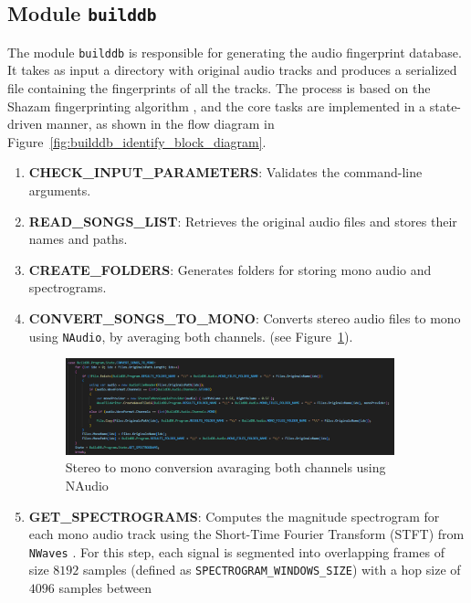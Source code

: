 \documentclass[11pt, a4paper]{article}
\begin{document}
    \newpage

    \subsection{Module \texttt{builddb}}

    The module \texttt{builddb} is responsible for generating the audio fingerprint database. It takes as input a directory with original audio 
    tracks and produces a serialized file containing the fingerprints of all the tracks. The process is based on the Shazam fingerprinting 
    algorithm \cite{ShazamAlgorithmPaper}, and the core tasks are implemented in a state-driven manner, as shown in the flow diagram in 
    Figure~\ref{fig:builddb_identify_block_diagram}.

    \begin{enumerate}
        \item \textbf{CHECK\_INPUT\_PARAMETERS}: Validates the command-line arguments.
        \item \textbf{READ\_SONGS\_LIST}: Retrieves the original audio files and stores their names and paths.
        \item \textbf{CREATE\_FOLDERS}: Generates folders for storing mono audio and spectrograms.
        \item \textbf{CONVERT\_SONGS\_TO\_MONO}: Converts stereo audio files to mono using \texttt{NAudio}, by averaging both channels. (see Figure~\ref{fig:mono_conversion}).
        \begin{figure}[H]
            \centering
            \includegraphics[width=0.9\textwidth]{media/stereo_to_mono.png}
            \caption{Stereo to mono conversion avaraging both channels using NAudio}
            \label{fig:mono_conversion}
        \end{figure}
        \item \textbf{GET\_SPECTROGRAMS}: Computes the magnitude spectrogram for each mono audio track using the Short-Time Fourier Transform (STFT) \newline from \texttt{NWaves} \cite{nwaves}. 
        For this step, each signal is segmented into overlapping frames of size $8192$ samples (defined as \texttt{SPECTROGRAM\_WINDOWS\_SIZE}) with a hop size of $4096$ samples between 

\end{enumerate}
\end{document}
